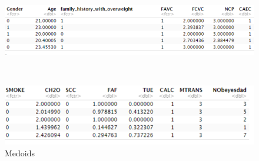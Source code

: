 \begin{figure}[!htb]
   \begin{minipage}{1\textwidth}
     \centering
     \includegraphics[width=1\linewidth]{image/Picture1.png}
   \end{minipage}\hfill
   \\
   \begin{minipage}{1\textwidth}
     \centering
     \includegraphics[width=1\linewidth]{image/Picture2.png}
   \end{minipage}
   \caption{Medoids}\label{med}
\end{figure}


